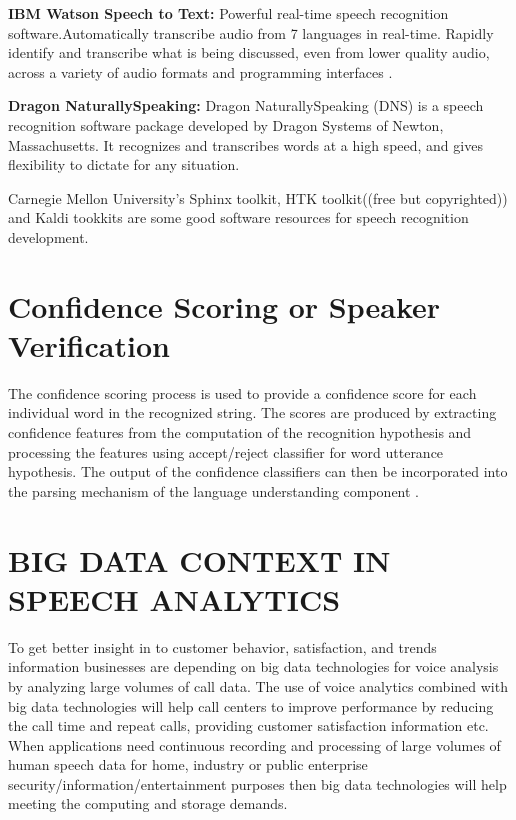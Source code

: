 \documentclass[sigconf]{acmart}
\begin{document}
\textbf{IBM Watson Speech to Text:} Powerful real-time speech recognition software.Automatically transcribe audio from 7 languages in real-time. Rapidly identify and transcribe what is being discussed, even from lower quality audio, across a variety of audio formats and programming interfaces \cite{IBM}. 

\textbf{Dragon NaturallySpeaking:} Dragon NaturallySpeaking (DNS) \cite{Dragon} is a speech recognition software package developed by Dragon Systems of Newton, Massachusetts. It recognizes and transcribes words at a high speed, and gives flexibility to dictate for any situation. 

\par\null\par
Carnegie Mellon University's Sphinx toolkit, HTK toolkit((free but copyrighted)) and Kaldi tookkits are some good software resources for speech recognition development. 

\section{Confidence Scoring or Speaker Verification}
The confidence scoring process is used to provide a confidence score for each individual word in the recognized string. The scores are produced by extracting confidence features from the computation of the recognition hypothesis and processing the features using accept/reject classifier for word utterance hypothesis. The output of the confidence classifiers can then be incorporated into the parsing mechanism of the language understanding component \cite{Hazen2000}. 

\section{BIG DATA CONTEXT IN SPEECH ANALYTICS}
To get better insight in to customer behavior, satisfaction, and trends information businesses are depending on big data technologies for voice analysis by analyzing large volumes of call data. The use of voice analytics combined with big data technologies will help call centers to improve performance by reducing the call time and repeat calls, providing customer satisfaction information etc.
\newline
When applications need continuous recording and processing of large volumes of human speech data for home, industry or public enterprise security/information/entertainment purposes then big data technologies will help meeting the computing and storage demands.  
\end{document}
